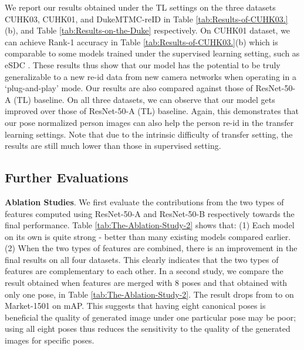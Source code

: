 \documentclass[10pt,letterpaper,twocolumn,10pt,letterpaper,twocolumn]{article}
\begin{document}
We report our results obtained under the TL settings on the three
datasets \textendash{} CUHK03, CUHK01, and DukeMTMC-reID in Table
\ref{tab:Results-of-CUHK03.}(b), and Table \ref{tab:Results-on-the-Duke}
respectively. On\textbf{ }CUHK01 dataset, we can achieve 
Rank-1 accuracy in Table \ref{tab:Results-of-CUHK03.}(b) which is
comparable to some models trained under the supervised learning setting,
such as eSDC {\cite{unsupervised_per_reid}}. These results
thus show that our model has the potential to be truly generalizable
to a new re-id data from new camera networks \textendash{} when operating
in a `plug-and-play' mode. Our results are also compared against those
of ResNet-50-A (TL) baseline. On all three datasets, we can observe that
our model gets improved over those of ResNet-50-A (TL) baseline. Again,
this demonstrates that our pose normalized person images can also
help the person re-id in the transfer learning settings. Note that
due to the intrinsic difficulty of transfer setting, the results are
still much lower than those in supervised setting. 

\subsection{Further Evaluations}

\noindent \textbf{Ablation Studies}. We first evaluate the contributions
from the two types of features computed using ResNet-50-A and ResNet-50-B
respectively towards the final performance. Table \ref{tab:The-Ablation-Study-2}
shows that: (1) Each model on its own is quite strong - better than
many existing models compared earlier.  (2) When the two types of features
are combined, there is an improvement in the final results on all four
datasets. This clearly indicates that the two types of features are
complementary to each other. In a second study, we compare the result
obtained when features are merged with 8 poses and that obtained with
only one pose, in Table \ref{tab:The-Ablation-Study-2}. The result
drops from  to  on Market-1501 on mAP. This suggests
that having eight canonical poses is beneficial \textendash{} the
quality of generated image under one particular pose may be poor;
using all eight poses thus reduces the sensitivity to the quality
of the generated images for specific poses.
\end{document}
